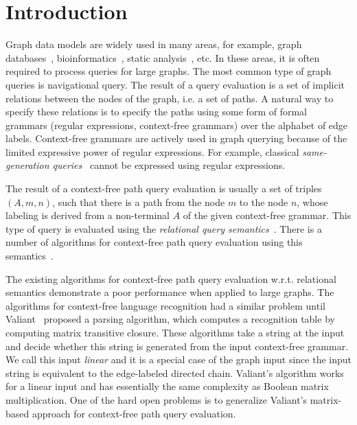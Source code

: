 \section{Introduction}

Graph data models are widely used in many areas, for example, graph databases~\cite{graphDB}, bioinformatics~\cite{Bio}, static analysis~\cite{kodumal2004set, zhang2013fast}, etc. In these areas, it is often required to process queries for large graphs. The most common type of graph queries is navigational query. The result of a query evaluation is a set of implicit relations between the nodes of the graph, i.e. a set of paths. A natural way to specify these relations is to specify the paths using some form of formal grammars (regular expressions, context-free grammars) over the alphabet of edge labels. Context-free grammars are actively used in graph querying because of the limited expressive power of regular expressions. For example, classical \emph{same-generation queries}~\cite{FndDB} cannot be expressed using regular expressions.

The result of a context-free path query evaluation is usually a set of triples \mbox{$(A, m, n)$}, such that there is a path from the node $m$ to the node $n$, whose labeling is derived from a non-terminal $A$ of the given context-free grammar. This type of query is evaluated using the \emph{relational query semantics}~\cite{hellingsRelational}. There is a number of algorithms for context-free path query evaluation using this semantics~\cite{GLL, hellingsRelational, RDF, GraphQueryWithEarley}.

The existing algorithms for context-free path query evaluation w.r.t. relational semantics demonstrate a poor performance when applied to large graphs. The algorithms for context-free language recognition had a similar problem until Valiant~\cite{valiant} proposed a parsing algorithm, which computes a recognition table by computing matrix transitive closure. These algorithms take a string at the input and decide whether this string is generated from the input context-free grammar. We call this input \textit{linear} and it is a special case of the graph input since the input string is equivalent to the edge-labeled directed chain. Valiant's algorithm works for a linear input and has essentially the same complexity as Boolean matrix multiplication. One of the hard open problems is to generalize Valiant's matrix-based approach for context-free path query evaluation.

